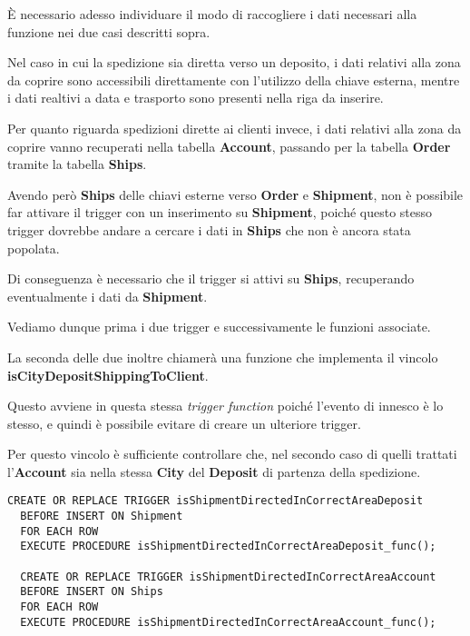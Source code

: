È necessario adesso individuare il modo di raccogliere i dati necessari alla funzione nei due casi descritti sopra.

Nel caso in cui la spedizione sia diretta verso un deposito, i dati relativi alla zona da coprire sono accessibili direttamente con l'utilizzo della chiave esterna, mentre i dati realtivi a data e trasporto sono presenti nella riga da inserire.

Per quanto riguarda spedizioni dirette ai clienti invece, i dati relativi alla zona da coprire vanno recuperati nella tabella \textbf{Account}, passando per la tabella \textbf{Order} tramite la tabella \textbf{Ships}.

Avendo però \textbf{Ships} delle chiavi esterne verso \textbf{Order} e \textbf{Shipment}, non è possibile far attivare il trigger con un inserimento su \textbf{Shipment}, poiché questo stesso trigger dovrebbe andare a cercare i dati in \textbf{Ships} che non è ancora stata popolata.

Di conseguenza è necessario che il trigger si attivi su \textbf{Ships}, recuperando eventualmente i dati da \textbf{Shipment}.

Vediamo dunque prima i due trigger e successivamente le funzioni associate. 

La seconda delle due inoltre chiamerà una funzione che implementa il vincolo \textbf{isCityDepositShippingToClient}. 

Questo avviene in questa stessa \textit{trigger function} poiché l'evento di innesco è lo stesso, e quindi è possibile evitare di creare un ulteriore trigger.

Per questo vincolo è sufficiente controllare che, nel secondo caso di quelli trattati l'\textbf{Account} sia nella stessa \textbf{City} del \textbf{Deposit} di partenza della spedizione. 

\begin{lstlisting}[caption={Trigger per il vincolo \textbf{isShipmentDirectedInCorrectArea}}]
  CREATE OR REPLACE TRIGGER isShipmentDirectedInCorrectAreaDeposit 
  BEFORE INSERT ON Shipment 
  FOR EACH ROW 
  EXECUTE PROCEDURE isShipmentDirectedInCorrectAreaDeposit_func();

  CREATE OR REPLACE TRIGGER isShipmentDirectedInCorrectAreaAccount 
  BEFORE INSERT ON Ships
  FOR EACH ROW 
  EXECUTE PROCEDURE isShipmentDirectedInCorrectAreaAccount_func();
\end{lstlisting}

